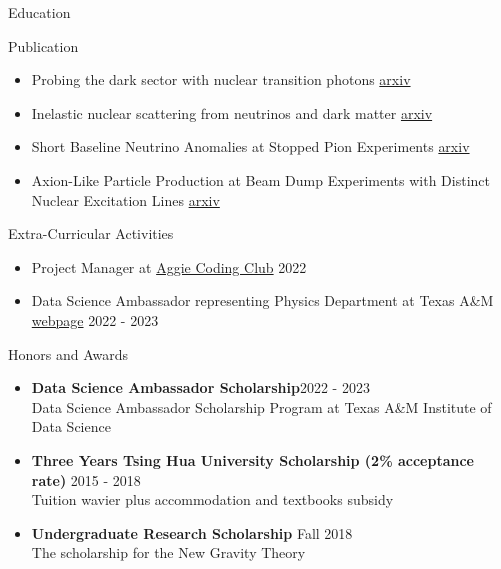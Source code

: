 \documentclass{resume}
\begin{document}
\begin{rSection}{Education}
\begin{rSection}{Publication}
    \begin{itemize}
        \item Probing the dark sector with nuclear transition photons \hfill \href{https://arxiv.org/pdf/2302.10250.pdf}{arxiv}
        \item Inelastic nuclear scattering from neutrinos and dark matter \hfill \href{https://arxiv.org/pdf/2206.08590.pdf}{arxiv}
        \item Short Baseline Neutrino Anomalies at Stopped Pion Experiments \hfill \href{https://arxiv.org/abs/2310.13194}{arxiv}
        \item Axion-Like Particle Production at Beam Dump Experiments with Distinct Nuclear Excitation Lines \hfill \href{https://arxiv.org/pdf/2207.13659.pdf}{arxiv}
    \end{itemize}
\end{rSection}


\begin{rSection}{Extra-Curricular Activities}
    \begin{itemize}
        \item Project Manager at \href{https://aggiecodingclub.com/}{Aggie Coding Club} \hfill 2022
        \item Data Science Ambassador representing Physics Department at Texas A\&M \href{https://noctildon.github.io/DS_ambassador/index.html}{webpage} \hfill 2022 - 2023
    \end{itemize}
\end{rSection}


\begin{rSection}{Honors and Awards}
    \begin{itemize}
        \item \textbf{Data Science Ambassador Scholarship}\hfill 2022 - 2023\\
        Data Science Ambassador Scholarship Program at Texas A\&M Institute of Data Science
        \item \textbf{Three Years Tsing Hua University Scholarship (2\% acceptance rate)} \hfill 2015 - 2018 \\
        Tuition wavier plus accommodation and textbooks subsidy
        \item \textbf{Undergraduate Research Scholarship} \hfill Fall 2018 \\
        The scholarship for the New Gravity Theory
    \end{itemize}
\end{rSection}

\end{rSection}
\end{document}
